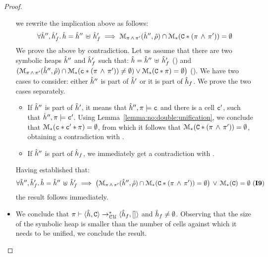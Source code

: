 \begin{proof}
\begin{itemize}
              we rewrite the implication above as follows: 
              $$
              	\forall \sheap'', \sheap_f' . \, \sheap = \sheap'' \dunion \sheap_f' \implies 
                     \smodels{\sheap'', \sstore}{\pc \, \wedge \, \pc'} \cap \sepmodels{\cells  \sep (\pc \, \wedge \, \pc')} = \emptyset   
              $$      
              We prove the above by contradiction. Let us assume that there are two symbolic heaps 
              $\sheap''$ and $\sheap_f'$ such that: $\sheap = \sheap'' \dunion \sheap_f'$ ()
              and $(\smodels{\sheap'', \sstore}{\pc \, \wedge \, \pc'} \cap \sepmodels{\cell \sep (\pc \, \wedge \, \pc')} \neq \emptyset) 
                   \vee  \sepmodels{\cells \sep \pc} = \emptyset \big)$ (). 
              We have two cases to consider: either $\sheap''$ is part of $\sheap'$ or it is part of 
              $\sheap_f$. We prove the two cases separately. 
              \begin{itemize}
                 \item If $\sheap''$ is part of $\sheap'$, it means that $\sheap'', \pc \satisfies \cell$ and there is a cell $\cell'$, 
                         such that $\sheap'', \pc \satisfies \cell'$. Using Lemma~\ref{lemma:no:double:unification}, 
                         we conclude that $\sepmodels{\cell \sep \cell' \sep \pc} = \emptyset$, from 
                         which it follows that $\sepmodels{\cells  \sep (\pc \, \wedge \, \pc')} = \emptyset$, 
                         obtaining a contradiction with . 
                  \item If $\sheap''$ is part of $\sheap_f$,  we immediately get a contradiction with .
              \end{itemize}
              Having established that: 
                $$
              	\forall \sheap'', \sheap_f' . \, \sheap = \sheap'' \dunion \sheap_f' \implies 
                     \big(
                        \smodels{\sheap'', \sstore}{\pc \, \wedge \, \pc'} \cap \sepmodels{\cells  \sep (\pc \, \wedge \, \pc')} = \emptyset
                      \big) \, \vee \, \sepmodels{\cells} = \emptyset  \text{ (\ieq{9})}
              $$ 
              the result follows immediately. 
        	      \vspace{6pt}
	      
          \item {} We conclude that
                   $\cellunificationiter{\sheap, \cells}{\sheap_f, []}{\pc}$ and $\sheap_f \neq \hemp$. Observing that 
                   the size of the symbolic heap is smaller than the number of cells against which it needs to be unified, 
                   we conclude the result. 
                   \vspace{6pt}
                        

\end{itemize}
\end{proof}
